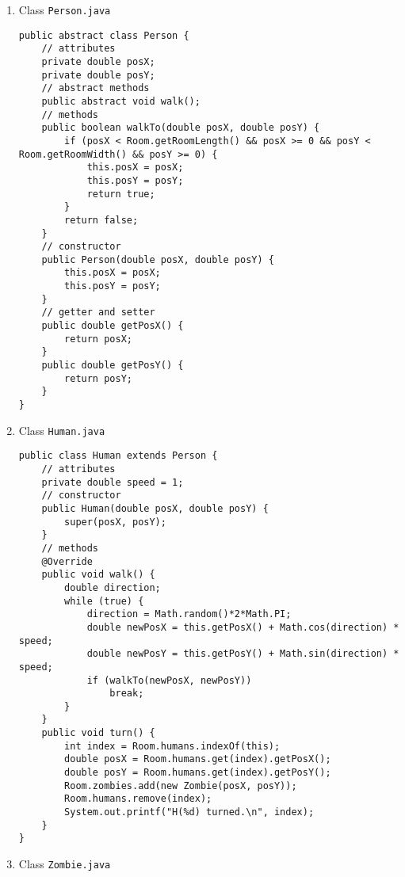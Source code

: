 \begin{enumerate}
\item Class \texttt{Person.java}

\lstset{language=java,tabsize=2}
\begin{lstlisting}
public abstract class Person {
	// attributes
	private double posX;
	private double posY;
	// abstract methods
	public abstract void walk();
	// methods
	public boolean walkTo(double posX, double posY) {
		if (posX < Room.getRoomLength() && posX >= 0 && posY < Room.getRoomWidth() && posY >= 0) {
			this.posX = posX;
			this.posY = posY;
			return true;
		}
		return false;
	}
	// constructor
	public Person(double posX, double posY) {
		this.posX = posX;
		this.posY = posY;
	}
	// getter and setter
	public double getPosX() {
		return posX;
	}
	public double getPosY() {
		return posY;
	}
}
\end{lstlisting}

\item Class \texttt{Human.java}

\lstset{language=java,tabsize=2}
\begin{lstlisting}
public class Human extends Person {
	// attributes
	private double speed = 1;
	// constructor
	public Human(double posX, double posY) {
		super(posX, posY);
	}
	// methods
	@Override
	public void walk() {
		double direction;
		while (true) {
			direction = Math.random()*2*Math.PI;
			double newPosX = this.getPosX() + Math.cos(direction) * speed;
			double newPosY = this.getPosY() + Math.sin(direction) * speed;
			if (walkTo(newPosX, newPosY))
				break;
		}
	}
	public void turn() {
		int index = Room.humans.indexOf(this);
		double posX = Room.humans.get(index).getPosX();
		double posY = Room.humans.get(index).getPosY();
		Room.zombies.add(new Zombie(posX, posY));
		Room.humans.remove(index);
		System.out.printf("H(%d) turned.\n", index);
	}
}
\end{lstlisting}

\item Class \texttt{Zombie.java}


\end{enumerate}
